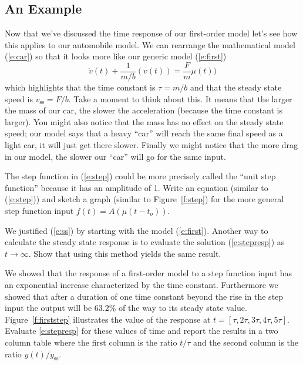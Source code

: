 \subsection{An Example}
Now that we've discussed the time response of our first-order model let's see how this applies to our automobile model.  We can rearrange the mathematical model (\ref{e:car}) so that it looks more like our generic model (\ref{e:first})
\begin{equation}\label{e:car2}
\dot{v}(t) + \frac{1}{m/b}(v(t)) = \frac{F}{m}\mu(t))
\end{equation}
which highlights that the time constant is $\tau=m/b$ and that the steady state speed is $v_{\mathrm{ss}}=F/b$.  Take a moment to think about this.  It means that the larger the mass of our car, the slower the acceleration (because the time constant is larger).  You might also notice that the mass has no effect on the steady state speed; our model says that a heavy ``car'' will reach the same final speed as a light car, it will just get there slower.  Finally we might notice that the more drag in our model, the slower our ``car'' will go for the same input.   

\begin{ex}
The step function in (\ref{e:step}) could be more precisely called the ``unit step function'' because it has an amplitude of 1.  Write an equation (similar to (\ref{e:step})) and sketch a graph (similar to Figure~\ref{f:step}) for the more general step function input $f(t) = A(\mu(t-t_o))$.
\end{ex}

\begin{ex}
We justified (\ref{e:ss}) by starting with the model (\ref{e:first}).  Another way to calculate the steady state response is to evaluate the solution (\ref{e:stepresp}) as $t \to \infty$.  Show that using this method yields the same result.
\end{ex}

\begin{ex}
We showed that the response of a first-order model to a step function input has an exponential increase characterized by the time constant.  Furthermore we showed that after a duration of one time constant beyond the rise in the step input the output will be 63.2\% of the way to its steady state value.  Figure~\ref{f:firststep} illustrates the value of the response at  $t=[\tau,2\tau,3\tau,4\tau,5\tau]$.  Evaluate \ref{e:stepresp} for these values of time and report the results in a two column table where the first column is the ratio $t/\tau$ and the second column is the ratio $y(t)/y_{\mathrm{ss}}$.
\end{ex}

